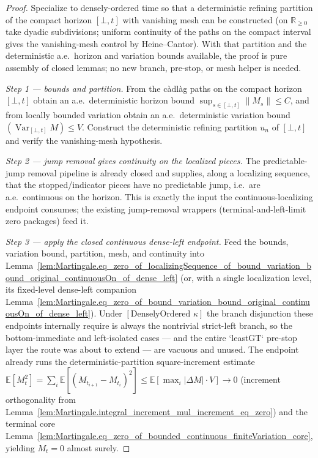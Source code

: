 \begin{proof}
Specialize to densely-ordered time so that a deterministic refining partition of
the compact horizon \([\bot,t]\) with vanishing mesh can be constructed (on
\(\mathbb R_{\ge 0}\) take dyadic subdivisions; uniform continuity of the paths on
the compact interval gives the vanishing-mesh control by Heine–Cantor).  With that
partition and the deterministic a.e.\ horizon and variation bounds available, the
proof is pure assembly of closed lemmas; no new branch, pre-stop, or mesh helper is
needed.

\emph{Step 1 — bounds and partition.}  From the càdlàg paths on the compact
horizon \([\bot,t]\) obtain an a.e.\ deterministic horizon bound \(\sup_{s\in[\bot,t]}\|M_s\|\le C\),
and from locally bounded variation obtain an a.e.\ deterministic variation bound
\((\operatorname{Var}_{[\bot,t]} M)\le V\).  Construct the deterministic refining
partition \(u_n\) of \([\bot,t]\) and verify the vanishing-mesh hypothesis.

\emph{Step 2 — jump removal gives continuity on the localized pieces.}  The
predictable-jump removal pipeline is already closed and supplies, along a localizing
sequence, that the stopped/indicator pieces have no predictable jump, i.e.\ are
a.e.\ continuous on the horizon.  This is exactly the input the continuous-localizing
endpoint consumes; the existing jump-removal wrappers (terminal-and-left-limit zero
packages) feed it.

\emph{Step 3 — apply the closed continuous dense-left endpoint.}  Feed the bounds,
variation bound, partition, mesh, and continuity into
Lemma~\ref{lem:Martingale.eq_zero_of_localizingSequence_of_bound_variation_bound_original_continuousOn_of_dense_left}
(or, with a single localization level, its fixed-level dense-left companion
Lemma~\ref{lem:Martingale.eq_zero_of_bound_variation_bound_original_continuousOn_of_dense_left}).
Under \([\text{DenselyOrdered }\kappa]\) the branch disjunction these endpoints
internally require is always the nontrivial strict-left branch, so the
bottom-immediate and left-isolated cases — and the entire `leastGT` pre-stop layer
the route was about to extend — are vacuous and unused.  The endpoint already runs
the deterministic-partition square-increment estimate
\(\mathbb E[M_t^2]=\sum_i \mathbb E[(M_{t_{i+1}}-M_{t_i})^2]\le \mathbb E[\max_i|\Delta M|\cdot V]\to 0\)
(increment orthogonality from
Lemma~\ref{lem:Martingale.integral_increment_mul_increment_eq_zero}) and the terminal
core Lemma~\ref{lem:Martingale.eq_zero_of_bounded_continuous_finiteVariation_core},
yielding \(M_t=0\) almost surely.
\end{proof}


